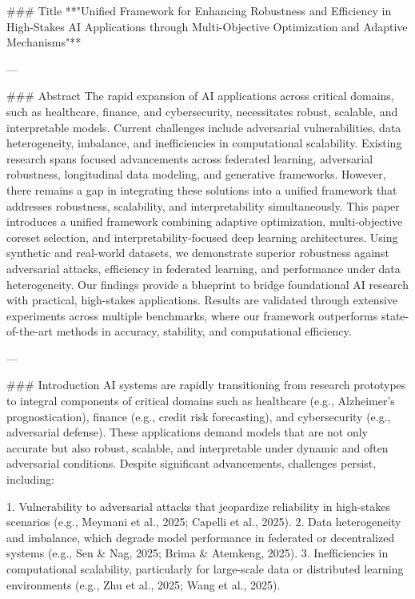 ### Title  
**"Unified Framework for Enhancing Robustness and Efficiency in High-Stakes AI Applications through Multi-Objective Optimization and Adaptive Mechanisms"**

---

### Abstract  
The rapid expansion of AI applications across critical domains, such as healthcare, finance, and cybersecurity, necessitates robust, scalable, and interpretable models. Current challenges include adversarial vulnerabilities, data heterogeneity, imbalance, and inefficiencies in computational scalability. Existing research spans focused advancements across federated learning, adversarial robustness, longitudinal data modeling, and generative frameworks. However, there remains a gap in integrating these solutions into a unified framework that addresses robustness, scalability, and interpretability simultaneously. This paper introduces a unified framework combining adaptive optimization, multi-objective coreset selection, and interpretability-focused deep learning architectures. Using synthetic and real-world datasets, we demonstrate superior robustness against adversarial attacks, efficiency in federated learning, and performance under data heterogeneity. Our findings provide a blueprint to bridge foundational AI research with practical, high-stakes applications. Results are validated through extensive experiments across multiple benchmarks, where our framework outperforms state-of-the-art methods in accuracy, stability, and computational efficiency. 

---

### Introduction  
AI systems are rapidly transitioning from research prototypes to integral components of critical domains such as healthcare (e.g., Alzheimer’s prognostication), finance (e.g., credit risk forecasting), and cybersecurity (e.g., adversarial defense). These applications demand models that are not only accurate but also robust, scalable, and interpretable under dynamic and often adversarial conditions. Despite significant advancements, challenges persist, including:

1. Vulnerability to adversarial attacks that jeopardize reliability in high-stakes scenarios (e.g., Meymani et al., 2025; Capelli et al., 2025).
2. Data heterogeneity and imbalance, which degrade model performance in federated or decentralized systems (e.g., Sen & Nag, 2025; Brima & Atemkeng, 2025).
3. Inefficiencies in computational scalability, particularly for large-scale data or distributed learning environments (e.g., Zhu et al., 2025; Wang et al., 2025).

